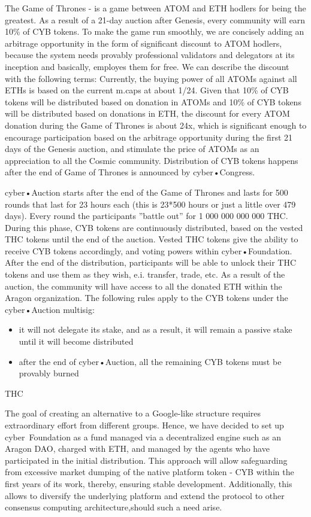 \documentclass[8pt,oneside]{amsart}
\makeatletter
\renewcommand\subsection{\@startsection{subsection}
                                    {2}{\z@}
                                    {-3.25ex\@plus -1ex \@minus -.2ex}
                                    {0ex \@plus .2ex}
                                    {\play\Large}
                        }
\newcommand{\titleSection}[1]{\subsection{#1}}
\makeatother
\begin{document}
The Game of Thrones - is a game between ATOM and ETH hodlers for being the greatest. As a result of a 21-day auction after
Genesis, every community will earn 10\% of CYB tokens. To make the game run smoothly, we are concisely adding an arbitrage
opportunity in the form of significant discount to ATOM hodlers, because the system needs provably professional validators and delegators at its inception and basically, employes them for free. We can describe the discount with the following terms: Currently, the buying power of all ATOMs against all ETHs is based on the current m.caps at about 1/24. Given that 10\% of CYB tokens will be distributed based on donation in ATOMs and 10\% of CYB tokens will be distributed based on donations in ETH, the discount for every ATOM donation during the Game of Thrones is about 24x, which is significant enough to encourage participation based on the arbitrage opportunity during the first 21 days of the Genesis auction, and stimulate the price of ATOMs as an appreciation to all the Cosmic community. Distribution of CYB tokens happens after the end of Game of Thrones is announced by cyber•Congress.

cyber•Auction starts after the end of the Game of Thrones and lasts for 500 rounds that last for 23 hours each (this is 23*500 hours or just a little over 479 days). Every round the participants ”battle out” for 1 000 000 000 000 THC. During this phase, CYB tokens are continuously distributed, based on the vested THC tokens until the end of the auction. Vested THC tokens give the ability to receive CYB tokens accordingly, and voting powers within cyber•Foundation. After the end of the distribution, participants will be able to unlock their THC tokens and use them as they wish, e.i. transfer, trade, etc. As a result of the auction, the community will have access to all the donated ETH within the Aragon organization. The following rules apply to the CYB tokens under the cyber•Auction multisig:

\begin{itemize}
\item it will not delegate its stake, and as a result, it will remain a passive stake until it will become distributed
\item after the end of cyber•Auction, all the remaining CYB tokens must be provably burned
\end{itemize}

\titleSection{THC}\label{THC}

The goal of creating an alternative to a Google-like structure requires extraordinary effort from different groups. Hence, we have decided to set up cyber~Foundation as a fund managed via a decentralized engine such as an Aragon DAO, charged with ETH, and managed by the agents who have participated in the initial distribution. This approach will allow safeguarding from excessive market dumping of the native platform token - CYB within the first years of its work, thereby, ensuring stable development. Additionally, this allows to diversify the underlying platform and extend the protocol to other consensus computing architecture,should such a need arise.
\end{document}
